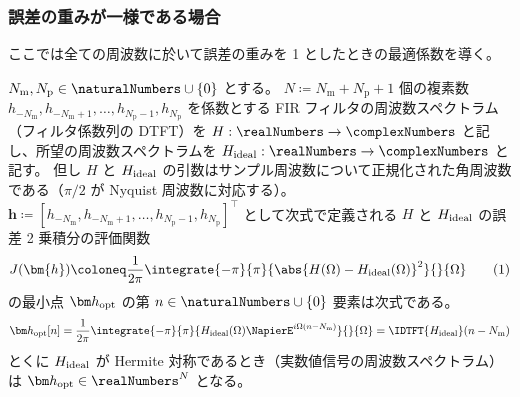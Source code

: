         \subsubsection{誤差の重みが一様である場合}
            \label{誤差の重みが一様である場合}
            \newcommand{\Nm}{{N_\text{m}}}
            \newcommand{\Np}{{N_\text{p}}}
            ここでは全ての周波数に於いて誤差の重みを 1 としたときの最適係数を導く。
            \begin{shadebox}
                $\Nm,\Np\in\naturalNumbers\cup\{0\}$ とする。
                $N\coloneq\Nm+\Np+1$ 個の複素数 $h_{-\Nm},h_{-\Nm+1},\dots,h_{\Np-1},h_\Np$ を係数とする FIR フィルタの周波数スペクトラム（フィルタ係数列の DTFT）を $H:\realNumbers\to\complexNumbers$ と記し、所望の周波数スペクトラムを $\Hideal:\realNumbers\to\complexNumbers$ と記す。
                但し $H$ と $H_\text{ideal}$ の引数はサンプル周波数について正規化された角周波数である（$\pi/2$ が Nyquist 周波数に対応する）。
                $\bm{h} \coloneq [h_{-\Nm},h_{-\Nm+1},\dots,h_{\Np-1},h_\Np]^\top$ として次式で定義される $H$ と $H_\text{ideal}$ の誤差 2 乗積分の評価関数
                \[ J(\bm{h}) \coloneq \frac{1}{2\pi}\integrate{-\pi}{\pi}{\abs{H(\Omega)-\Hideal(\Omega)}^2}{}{\Omega} \tag{1} \]
                の最小点 $\vhOpt$ の第 $n\in\naturalNumbers\cup\{0\}$ 要素は次式である。
                \[ \vhOpt[n] = \frac{1}{2\pi}\integrate{-\pi}{\pi}{\Hideal(\Omega)\NapierE^{i\Omega (n-\Nm)}}{}{\Omega} = \IDTFT{\Hideal}(n-\Nm) \]
                とくに $H_\text{ideal}$ が Hermite 対称であるとき（実数値信号の周波数スペクトラム）は $\vhOpt\in\realNumbers^N$ となる。
            \end{shadebox}
